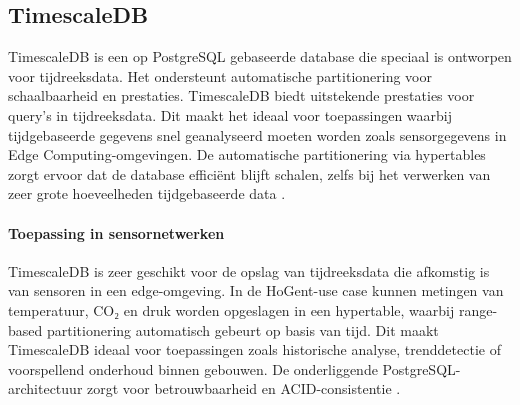 \begin{table}[H]
    \centering
    \caption{Overzicht van de specificaties van Redis. \cite{RedisDocumentation}}
\end{table}

\subsection{TimescaleDB}

TimescaleDB is een op PostgreSQL gebaseerde database die speciaal is ontworpen voor tijdreeksdata. Het ondersteunt automatische partitionering voor schaalbaarheid en prestaties. TimescaleDB biedt uitstekende prestaties voor query's in tijdreeksdata. Dit maakt het ideaal voor toepassingen waarbij tijdgebaseerde gegevens snel geanalyseerd moeten worden zoals sensorgegevens in Edge Computing-omgevingen. De automatische partitionering via hypertables zorgt ervoor dat de database efficiënt blijft schalen, zelfs bij het verwerken van zeer grote hoeveelheden tijdgebaseerde data \autocite{TimescaleDBDocumentation}.

\paragraph{Toepassing in sensornetwerken}  
TimescaleDB is zeer geschikt voor de opslag van tijdreeksdata die afkomstig is van sensoren in een edge-omgeving. In de HoGent-use case kunnen metingen van temperatuur, CO₂ en druk worden opgeslagen in een hypertable, waarbij range-based partitionering automatisch gebeurt op basis van tijd. Dit maakt TimescaleDB ideaal voor toepassingen zoals historische analyse, trenddetectie of voorspellend onderhoud binnen gebouwen. De onderliggende PostgreSQL-architectuur zorgt voor betrouwbaarheid en ACID-consistentie \autocite{TimescaleDBDocumentation, Kleppmann2017}.

